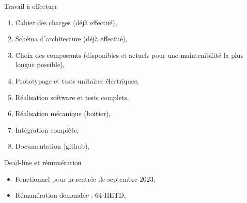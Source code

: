 \documentclass[aspectratio=169]{beamer}
\begin{document}
\begin{frame}{Travail à effectuer}
\begin{enumerate}
	\item Cahier des charges (déjà effectué),
	\item Schéma d'architecture (déjà effectué),
	\item Choix des composants (disponibles et actuels pour une maintenibilité la plus longue possible),
	\item Prototypage et tests unitaires électriques,
	\item Réalisation software et tests complets,
	\item Réalisation mécanique (boitier),
	\item Intégration complète,
	\item Documentation (github),
\end{enumerate}

\end{frame}

\begin{frame}{Dead-line et rémunération}
\begin{itemize}
	\item Fonctionnel pour la rentrée de septembre 2023,
	\item Rémunération demandée : 64 HETD,
\end{itemize}

\end{frame}
\end{document}

